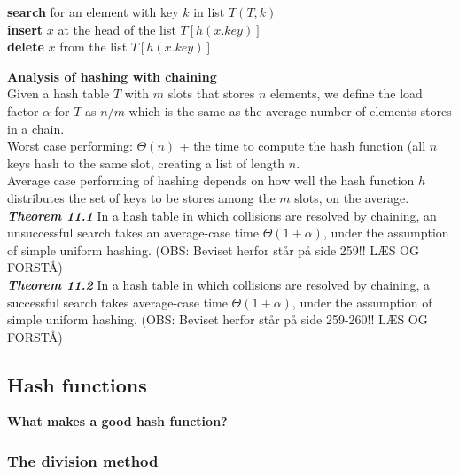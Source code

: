 \documentclass[12pt,a4paper]{article}
\begin{document}
\begin{algorithm}
\begin{algorithmic}[1]
   \State \textbf{search} for an element with key $k$ in list $T(T, k)$\\
   
   \State \textbf{insert} $x$ at the head of the list $T[h(x.key)]$\\

   \State \textbf{delete} $x$ from the list $T[h(x.key)]$
\end{algorithmic}
\end{algorithm}

\textbf{Analysis of hashing with chaining}\\
Given a hash table $T$ with $m$ slots that stores $n$ elements, we define the load factor $\alpha$ for $T$ as $n/m$ which is the same as the average number of elements stores in a chain. \\

Worst case performing: $\Theta (n)$ + the time to compute the hash function (all $n$ keys hash to the same slot, creating a list of length $n$. \\

Average case performing of hashing depends on how well the hash function $h$ distributes the set of keys to be stores among the $m$ slots, on the average. \\

\textbf{\textit{Theorem 11.1}}
In a hash table in which collisions are resolved by chaining, an unsuccessful search takes an average-case time $\Theta (1 + \alpha)$, under the assumption of simple uniform hashing. (OBS: Beviset herfor står på side 259!! LÆS OG FORSTÅ)\\

\textbf{\textit{Theorem 11.2}} 
In a hash table in which collisions are resolved by chaining, a successful search takes average-case time $\Theta (1 + \alpha)$, under the assumption of simple uniform hashing. (OBS: Beviset herfor står på side 259-260!! LÆS OG FORSTÅ)

\subsection{Hash functions}
\textbf{What makes a good hash function?}

\subsubsection{The division method}
\end{document}
